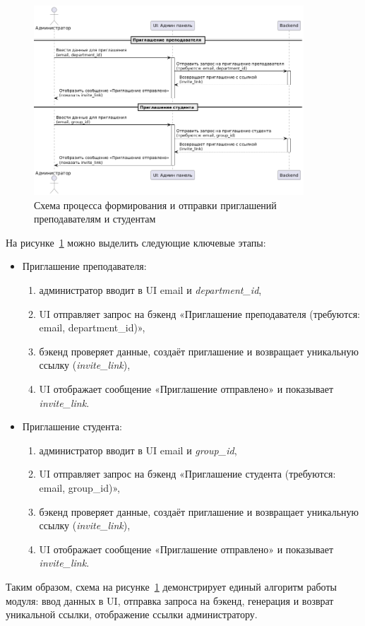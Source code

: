 \begin{figure}[h]
    \centering
    \includegraphics[width=0.9\textwidth]{static/diagrams/Admin.png}
    \caption{Схема процесса формирования и отправки приглашений преподавателям и студентам}
    \label{fig:admin-invite}
\end{figure}

На рисунке~\ref{fig:admin-invite} можно выделить следующие ключевые этапы:
\begin{itemize}
    \item Приглашение преподавателя:
    \begin{enumerate}
        \item администратор вводит в UI email и \textit{department\_id},
        \item UI отправляет запрос на бэкенд «Приглашение преподавателя (требуются: email, department\_id)»,
        \item бэкенд проверяет данные, создаёт приглашение и возвращает уникальную ссылку (\textit{invite\_link}),
        \item UI отображает сообщение «Приглашение отправлено» и показывает \textit{invite\_link}.
    \end{enumerate}
    \item Приглашение студента:
    \begin{enumerate}
        \item администратор вводит в UI email и \textit{group\_id},
        \item UI отправляет запрос на бэкенд «Приглашение студента (требуются: email, group\_id)»,
        \item бэкенд проверяет данные, создаёт приглашение и возвращает уникальную ссылку (\textit{invite\_link}),
        \item UI отображает сообщение «Приглашение отправлено» и показывает \textit{invite\_link}.
    \end{enumerate}
\end{itemize}

Таким образом, схема на рисунке~\ref{fig:admin-invite} демонстрирует единый алгоритм работы модуля: ввод данных в UI, отправка запроса на бэкенд, генерация и возврат уникальной ссылки, отображение ссылки администратору.
